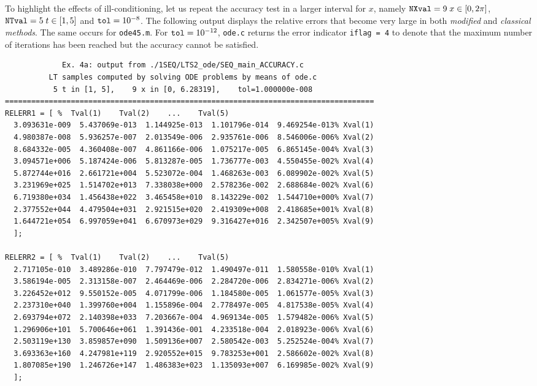\documentclass[a4paper,10pt]{report}%
\begin{document}
\noindent To highlight the effects of ill-conditioning, let us repeat the accuracy test in a larger interval for
$x$, namely ${\tt NXval}=9\; x\in[0,2\pi]$, ${\tt NTval}=5\; t\in[1,5]$ and ${\tt tol}=10^{-8}$.
The following output displays the relative errors that become very large in both {\em modified} and {\em
classical methods}. The same occurs for {\tt ode45.m}.
For ${\tt tol}=10^{-12}$, {\tt ode.c} returns the error indicator {\tt iflag = 4} to denote that the maximum
number of iterations has been reached but the accuracy cannot be satisfied.
\begin{lstlisting}
             Ex. 4a: output from ./1SEQ/LTS2_ode/SEQ_main_ACCURACY.c
          LT samples computed by solving ODE problems by means of ode.c
           5 t in [1, 5],    9 x in [0, 6.28319],    tol=1.000000e-008
====================================================================================
RELERR1 = [ %  Tval(1)    Tval(2)    ...    Tval(5)
  3.093631e-009  5.437069e-013  1.144925e-013  1.101796e-014  9.469254e-013% Xval(1)
  4.980387e-008  5.936257e-007  2.013549e-006  2.935761e-006  8.546006e-006% Xval(2)
  8.684332e-005  4.360408e-007  4.861166e-006  1.075217e-005  6.865145e-004% Xval(3)
  3.094571e+006  5.187424e-006  5.813287e-005  1.736777e-003  4.550455e-002% Xval(4)
  5.872744e+016  2.661721e+004  5.523072e-004  1.468263e-003  6.089902e-002% Xval(5)
  3.231969e+025  1.514702e+013  7.338038e+000  2.578236e-002  2.688684e-002% Xval(6)
  6.719380e+034  1.456438e+022  3.465458e+010  8.143229e-002  1.544710e+000% Xval(7)
  2.377552e+044  4.479504e+031  2.921515e+020  2.419309e+008  2.418685e+001% Xval(8)
  1.644721e+054  6.997059e+041  6.670973e+029  9.316427e+016  2.342507e+005% Xval(9)
  ];

RELERR2 = [ %  Tval(1)    Tval(2)    ...    Tval(5)
  2.717105e-010  3.489286e-010  7.797479e-012  1.490497e-011  1.580558e-010% Xval(1)
  3.586194e-005  2.313158e-007  2.464469e-006  2.284720e-006  2.834271e-006% Xval(2)
  3.226452e+012  9.550152e-005  4.071799e-006  1.184580e-005  1.061577e-005% Xval(3)
  2.237310e+040  1.399760e+004  1.155896e-004  2.778497e-005  4.817538e-005% Xval(4)
  2.693794e+072  2.140398e+033  7.203667e-004  4.969134e-005  1.579482e-006% Xval(5)
  1.296906e+101  5.700646e+061  1.391436e-001  4.233518e-004  2.018923e-006% Xval(6)
  2.503119e+130  3.859857e+090  1.509136e+007  2.580542e-003  5.252524e-004% Xval(7)
  3.693363e+160  4.247981e+119  2.920552e+015  9.783253e+001  2.586602e-002% Xval(8)
  1.807085e+190  1.246726e+147  1.486383e+023  1.135093e+007  6.169985e-002% Xval(9)
  ];
\end{lstlisting}
\end{document}
